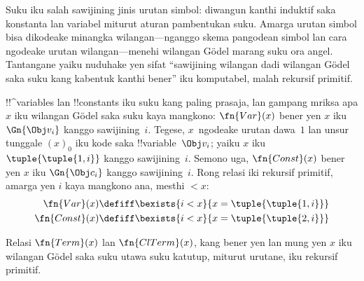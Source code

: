 \documentclass[../../../include/open-logic-section]{subfiles}
\begin{document}

\begin{explain}
Suku iku salah sawijining jinis urutan simbol:
diwangun kanthi induktif saka konstanta lan
variabel miturut aturan pambentukan suku.
Amarga urutan simbol bisa dikodeake minangka
wilangan---nganggo skema pangodean simbol
lan cara ngodeake urutan wilangan---menehi
wilangan G\"odel marang suku ora angel.
Tantangane yaiku nuduhake yen sifat
``sawijining wilangan dadi wilangan G\"odel
saka suku kang kabentuk kanthi bener''
iku komputabel, malah rekursif primitif.
\end{explain}

!!^{variable}s lan !!{constant}s iku suku
kang paling prasaja, lan gampang mriksa apa
$x$ iku wilangan G\"odel saka suku kaya mangkono:
$\fn{Var}(x)$ bener yen $x$ iku $\Gn{\Obj v_i}$
kanggo sawijining~$i$. Tegese, $x$~ngodeake
urutan dawa~$1$ lan unsur tunggale $(x)_0$
iku kode saka !!{variable}~$\Obj v_i$;
yaiku $x$ iku $\tuple{\tuple{1, i}}$
kanggo sawijining~$i$. Semono uga,
$\fn{Const}(x)$ bener yen $x$ iku
$\Gn{\Obj c_i}$ kanggo sawijining~$i$.
Rong relasi iki rekursif primitif,
amarga yen $i$ kaya mangkono ana,
mesthi $< x$:
\begin{align*}
  \fn{Var}(x) & \defiff \bexists{i<x}{x = \tuple{\tuple{1, i}}}\\
  \fn{Const}(x) & \defiff \bexists{i<x}{x = \tuple{\tuple{2, i}}}
\end{align*}

\begin{prop}
Relasi $\fn{Term}(x)$ lan $\fn{ClTerm}(x)$,
kang bener yen lan mung yen $x$ iku wilangan
G\"odel saka suku utawa suku katutup,
miturut urutane, iku rekursif primitif.
\end{prop}
\end{document}
